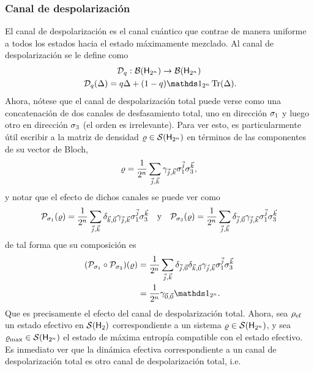\subsubsection{Canal de despolarización}

El canal de despolarización es el canal cuántico que contrae de manera uniforme a todos los estados hacia el estado máximamente mezclado. Al canal de despolarización se le define como
\begin{gather}\label{eq:DepolarizingChannelN}
    \mcD_{q}:\mcB(\hilbert_{2^{n}}) \rightarrow \mcB(\hilbert_{2^{n}})\nonumber\\
    \mcD_{q}(\Delta)=q\Delta+(1-q)\Id_{2^{n}}\Tr(\Delta)\rlap{.}
\end{gather}
Ahora, nótese que el canal de despolarización total puede verse como una concatenación de dos canales de desfasamiento total, uno en dirección $\sigma_{1}$ y luego otro en dirección $\sigma_{3}$ (el orden es irrelevante). Para ver esto, es particularmente útil escribir a la matriz de densidad $\varrho\in\mathcal{S}({\sf H}_{2^{n}})$ en términos de las componentes de su vector de Bloch,
\begin{equation}
    \varrho=\frac{1}{2^{n}}\sum_{\vec{j},\vec{k}}\gamma_{\vec{j},\vec{k}}\sigma_{1}^{\vec{j}}\sigma_{3}^{\vec{k}},\nonumber
\end{equation}
y notar que el efecto de dichos canales se puede ver como
\begin{align}
    \mathcal{P}_{\sigma_{1}}(\varrho)=\frac{1}{2^{n}}\sum_{\vec{j},\vec{k}}\delta_{\vec{k},\vec{0}}\gamma_{\vec{j},\vec{k}}\sigma_{1}^{\vec{j}}\sigma_{3}^{\vec{k}}  & & \text{y} & & \mathcal{P}_{\sigma_{3}}(\varrho)=\frac{1}{2^{n}}\sum_{\vec{j},\vec{k}}\delta_{\vec{j},\vec{0}}\gamma_{\vec{j},\vec{k}}\sigma_{1}^{\vec{j}}\sigma_{3}^{\vec{k}} \nonumber
\end{align}
de tal forma que su composición es
\begin{align}
    \qty(\mcP_{\pauli{1}}\circ \mcP_{\pauli{3}})(\varrho)&=\frac{1}{2^{n}}\sum_{\vec{j},\vec{k}}\delta_{\vec{j},\vec{0}}\delta_{\vec{k},\vec{0}}\gamma_{\vec{j},\vec{k}}\pauli{1}^{\vec{j}}\pauli{3}^{\vec{k}}\nonumber\\
    &=\frac{1}{2^{n}}\gamma_{\vec{0},\vec{0}}\Id_{2^{n}}.\nonumber
\end{align}
Que es precisamente el efecto del canal de despolarización total. Ahora, sea $\rho_{\text{ef}}$ un estado efectivo en $\mathcal{S}({\sf H}_{2})$ correspondiente a un sistema $\varrho \in \mathcal{S}({\sf H}_{2^{n}})$, y sea $\varrho_{\max}\in\mathcal{S}({\sf H}_{2^{n}})$ el estado de máxima entropía compatible con el estado efectivo. Es inmediato ver que la dinámica efectiva correspondiente a un canal de despolarización total es otro canal de despolarización total, i.e.
